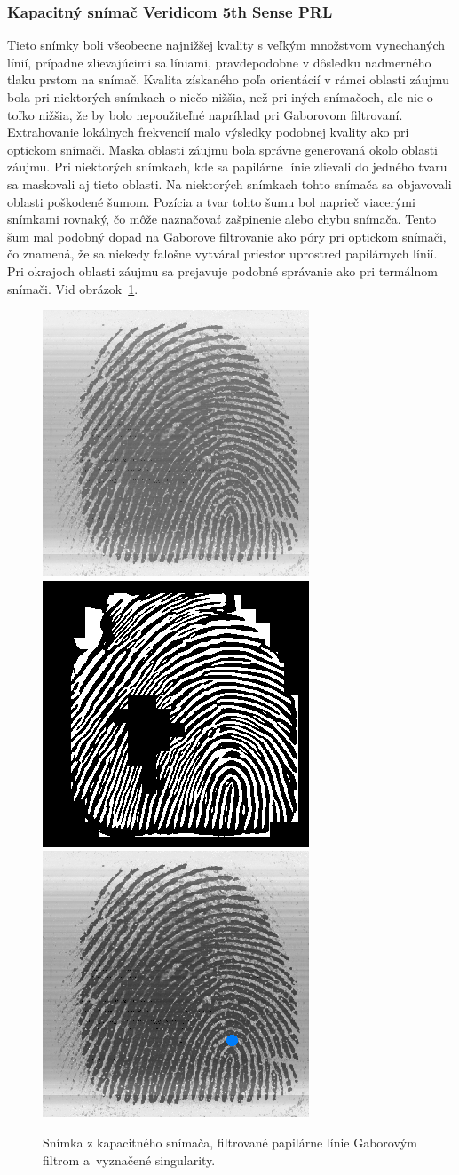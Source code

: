   \subsubsection{Kapacitný snímač Veridicom 5th Sense PRL}
  Tieto snímky boli všeobecne najnižšej kvality s veľkým množstvom vynechaných línií, prípadne zlievajúcimi sa líniami, pravdepodobne v dôsledku nadmerného
  tlaku prstom na snímač. Kvalita získaného poľa orientácií v rámci oblasti záujmu bola pri niektorých snímkach o niečo nižšia, než pri iných snímačoch, ale
  nie o toľko nižšia, že by bolo nepoužiteľné napríklad pri Gaborovom filtrovaní. Extrahovanie lokálnych frekvencií malo výsledky podobnej kvality ako pri
  optickom snímači. Maska oblasti záujmu bola správne generovaná okolo oblasti záujmu. Pri niektorých snímkach, kde sa papilárne línie zlievali do jedného
  tvaru sa maskovali aj tieto oblasti.
  Na niektorých snímkach tohto snímača sa objavovali oblasti poškodené šumom. Pozícia a tvar tohto šumu bol naprieč viacerými snímkami rovnaký, čo môže
  naznačovať zašpinenie alebo chybu snímača. Tento šum mal podobný dopad na Gaborove filtrovanie ako póry pri optickom snímači, čo znamená, že sa niekedy
  falošne vytváral priestor uprostred papilárnych línií. Pri okrajoch oblasti záujmu sa prejavuje podobné správanie ako pri termálnom snímači.
  Viď obrázok~{\ref{obr:vyhodnotenie_capac_mini}}.
  \begin{figure}[h]\centering
    \centering
    \includegraphics[width=0.32\linewidth]{obrazky-figures/eval_results/capac_orig.png}\hfill
    \includegraphics[width=0.32\linewidth]{obrazky-figures/eval_results/capac_gabor.png}\hfill
    \includegraphics[width=0.32\linewidth]{obrazky-figures/eval_results/capac_singularities.png}
    \caption{Snímka z kapacitného snímača, filtrované papilárne línie Gaborovým filtrom a~vyznačené singularity.}
    \label{obr:vyhodnotenie_capac_mini}
  \end{figure}

